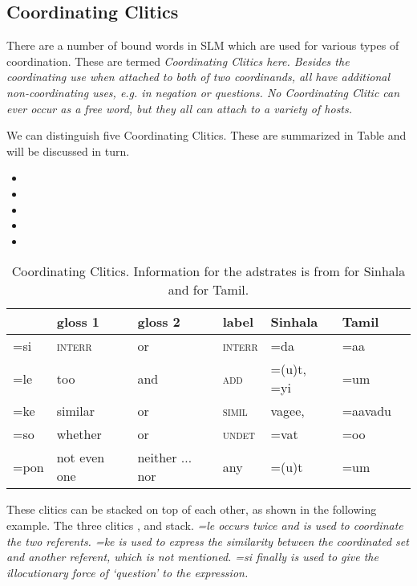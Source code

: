 \subsection{Coordinating Clitics}\label{sec:morph:CoordinatingClitics}
There are a number of bound words in SLM which are used for various types of coordination. These are termed \em Coordinating Clitics \em here. Besides the coordinating use when attached to both of two coordinands, all have additional non-coordinating uses, e.g. in negation or questions. No Coordinating Clitic can ever occur as a free word, but they all can attach to a variety of hosts.

We can distinguish five Coordinating Clitics. These are summarized in Table  and will be discussed in turn.
\begin{itemize}
 \item {} 
 \item {} 
 \item {} 
 \item {} 
 \item {} 
\end{itemize}




\begin{table}
	\centering
		\begin{tabular}{lllllll}
& gloss 1 & gloss 2  & label  &  Sinhala & Tamil \\
\hline
=si	& \textsc{interr} & or	& \textsc{interr} & =da & =aa \\
=le	& too		& and	& \textsc{add} &  =(u)t, =yi & =um \\
=ke	& similar	& or 	& \textsc{simil}  &  vagee, &  =aavadu\\
=so	& whether	& or	& \textsc{undet} &  =vat & =oo \\
=pon 	& not even one	& neither $\dots$ nor & any & =(u)t & =um\\
	\end{tabular}
	\caption[Coordinating Clitics]{Coordinating Clitics. Information for the adstrates is from \citet{Karunatillake2004} for Sinhala and \citet{Lehmann1989} for Tamil.}
	\label{tab:BooleanClitics}
\end{table}

These clitics can be stacked on top of each other, as shown in the following example. The three  clitics ,  and  stack. \em =le \em occurs twice and is used to coordinate the two referents. \em =ke \em is used to express the similarity between the coordinated set and another referent, which is not mentioned. \em =si \em finally is used to give the illocutionary force of `question' to the expression.


